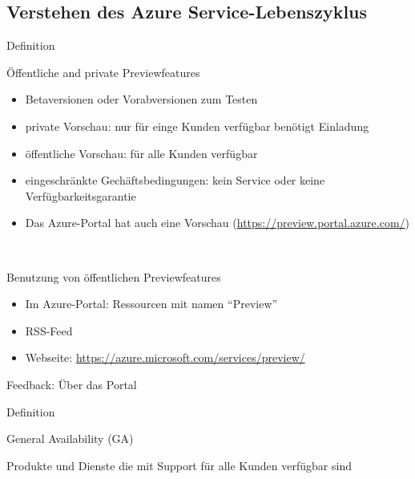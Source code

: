 \documentclass{scrartcl}
\newenvironment{flashcard}[2][]{%
    #1
    \vfill
    \centerline{\Large{#2}}
    \vfill
\newpage
}
{\newpage}
\newcommand{\subsectioncard}[1]{
    \vspace*{\stretch{1}}
    \subsection{#1}
    \vspace*{\stretch{1}}
    \pagebreak
}
\begin{document}
    \subsectioncard{Verstehen des Azure Service-Lebenszyklus}

    \begin{flashcard}[Definition]{Öffentliche and private Previewfeatures}
        \begin{itemize}
            \item Betaversionen oder Vorabversionen zum Testen
            \item private Vorschau: nur für einge Kunden verfügbar\newline
            benötigt Einladung
            \item öffentliche Vorschau: für alle Kunden verfügbar
            \item eingeschränkte Gechäftsbedingungen: kein Service oder keine Verfügbarkeitsgarantie
            \item Das Azure-Portal hat auch eine Vorschau\newline
            (\href{https://preview.portal.azure.com/}{https://preview.portal.azure.com/})
        \end{itemize}
    \end{flashcard}

    \begin{flashcard}[\ ]{Benutzung von öffentlichen Previewfeatures}
        \begin{itemize}
            \item Im Azure-Portal: Ressourcen mit namen ``Preview''
            \item RSS-Feed
            \item Webseite: \href{https://azure.microsoft.com/services/preview/}{https://azure.microsoft.com/services/preview/}
        \end{itemize}

        \vspace{5mm}
        Feedback: Über das Portal
    \end{flashcard}

    \begin{flashcard}[Definition]{General Availability (GA)}
        Produkte und Dienste die mit Support für alle Kunden verfügbar sind
    \end{flashcard}
\end{document}
